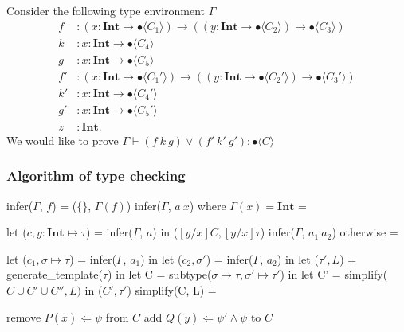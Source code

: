 \documentclass[runningheads]{llncs}
\newcommand \stypeint {\textbf{Int}}
\newcommand \stypebool {\bullet}
\newcommand \typeint[1]{{#1} : \stypeint}
\newcommand \typebool[1]{\stypebool \langle #1 \rangle}
\newlength\myindent
\newcommand\bindent{%
  \begingroup
  \setlength{\itemindent}{\myindent}
  \addtolength{\algorithmicindent}{\myindent}
}
\newcommand\eindent{\endgroup}
\begin{document}
Consider the following type environment \(\Gamma\)
\begin{align*}
    f&: (\typeint{x} \to \typebool{C_1}) \to ((\typeint{y} \to \typebool{C_2})
    \to \typebool{C_3})\\
    k&: \typeint{x} \to \typebool{C_4}\\
    g&: \typeint{x} \to \typebool{C_5}\\
    f'&: (\typeint{x} \to \typebool{C_1'}) \to ((\typeint{y} \to \typebool{C_2'})
    \to \typebool{C_3'})\\
    k'&: \typeint{x} \to \typebool{C_4'}\\
    g'&: \typeint{x} \to \typebool{C_5'}\\
    z&: \stypeint.
\end{align*}
We would like to prove \( \Gamma \vdash (f\ k\ g) \lor (f'\ k'\ g'):
\typebool{C}\)


\subsubsection{Algorithm of type checking}

\begin{algorithmic}
\STATE infer($\Gamma$, $f$) = ($\{\}$, $\Gamma(f)$)
\STATE infer($\Gamma$, $a\ x$) where $\Gamma(x) = \stypeint$ =
    \bindent
    \STATE let ($c, \typeint{y} \mapsto \tau$) = infer($\Gamma$, $a$) in
    \STATE ($[y/x]C, [y/x]\tau$)
    \eindent
\STATE infer($\Gamma$, $a_1\ a_2$) otherwise =
    \bindent
    \STATE let ($c_1, \sigma \mapsto \tau$) = infer($\Gamma$, $a_1$) in
    \STATE let ($c_2, \sigma'$) = infer($\Gamma$, $a_2$) in
    \STATE let ($\tau', L$) = generate\_template($\tau$) in
    \STATE let C = subtype($\sigma \mapsto \tau, \sigma'\mapsto \tau'$) in
    \STATE let C' = simplify($ C \cup C' \cup C'', L)$ in
    \STATE ($ C', \tau'$)
    \eindent
\STATE simplify(C, L) =
    \bindent
            \STATE remove $P(\tilde{x}) \Leftarrow \psi$ from $C$
            \STATE add $Q(\tilde{y}) \Leftarrow \psi' \land \psi$ to $C$
        \ENDFOR
    \ENDWHILE
    \eindent

\end{algorithmic}
\end{document}
